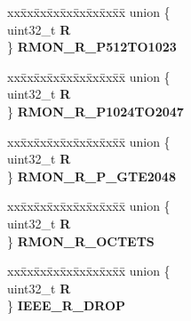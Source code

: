 \begin{DoxyCompactItemize}
\begin{tabbing}
\end{tabbing}\item 
\mbox{\label{structFEC__tag_a541b0731ec233ce83dd161fe2b608fa1}} 
\begin{tabbing}
xx\=xx\=xx\=xx\=xx\=xx\=xx\=xx\=xx\=\kill
union \{\\
\>uint32\_t {\bfseries R}\\
\} {\bfseries RMON\_R\_P512TO1023}\\

\end{tabbing}\item 
\mbox{\label{structFEC__tag_a1713ba96a0820ee6241733a2a7b1f328}} 
\begin{tabbing}
xx\=xx\=xx\=xx\=xx\=xx\=xx\=xx\=xx\=\kill
union \{\\
\>uint32\_t {\bfseries R}\\
\} {\bfseries RMON\_R\_P1024TO2047}\\

\end{tabbing}\item 
\mbox{\label{structFEC__tag_ac4f684e77d1bb0df22cb0d6f2259a1a9}} 
\begin{tabbing}
xx\=xx\=xx\=xx\=xx\=xx\=xx\=xx\=xx\=\kill
union \{\\
\>uint32\_t {\bfseries R}\\
\} {\bfseries RMON\_R\_P\_GTE2048}\\

\end{tabbing}\item 
\mbox{\label{structFEC__tag_aaedf1c51e0132f9a1bb5a73b8aee0746}} 
\begin{tabbing}
xx\=xx\=xx\=xx\=xx\=xx\=xx\=xx\=xx\=\kill
union \{\\
\>uint32\_t {\bfseries R}\\
\} {\bfseries RMON\_R\_OCTETS}\\

\end{tabbing}\item 
\mbox{\label{structFEC__tag_a6326e3583d2bfd96718d106cb0e83f38}} 
\begin{tabbing}
xx\=xx\=xx\=xx\=xx\=xx\=xx\=xx\=xx\=\kill
union \{\\
\>uint32\_t {\bfseries R}\\
\} {\bfseries IEEE\_R\_DROP}\\


\end{tabbing}
\end{DoxyCompactItemize}

